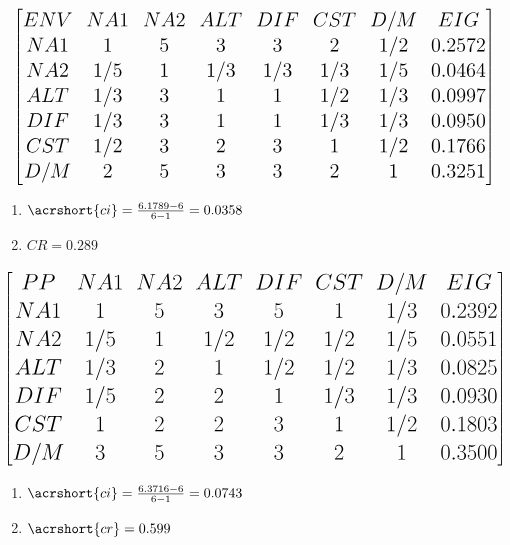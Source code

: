 \documentclass[aspectratio=1610,pdftex,dvipsnames,compress,xcolor={dvipsnames}]{beamer}
\newcommand{\acs}{\acrshort} %
\begin{document}
\begin{frame}{}
    \begin{equation}
        \Large
        \begin{bmatrix}
            ENV &NA1 &NA2 &ALT &DIF &CST &D/M &EIG \\
            NA1 &1 &5 &3 &3 &2 &1/2 &0.2572 \\
            NA2 &1/5 &1 &1/3 &1/3 &1/3 &1/5 &0.0464 \\
            ALT &1/3 &3 &1 &1 &1/2 &1/3 &0.0997 \\
            DIF &1/3 &3 &1 &1 &1/3 &1/3 &0.0950 \\ 
            CST &1/2 &3 &2 &3 &1 &1/2 &0.1766 \\ 
            D/M &2 &5 &3 &3 &2 &1 &0.3251 
        \end{bmatrix} 
    \end{equation}

    \begin{enumerate}[series=outerlist,topsep=0pt,itemsep=5pt,leftmargin=*,label=(\arabic*)]
        \item[]$\acs{ci} = \frac{6.1789-6}{6-1} = 0.0358$
        \item[]$CR = 0.289$
    \end{enumerate}
\end{frame}


\begin{frame}{}
    \begin{equation}
        \LARGE
        \begin{bmatrix}
            PP &NA1 &NA2 &ALT &DIF &CST &D/M &EIG \\ 
            NA1 &1 &5 &3 &5 &1 &1/3 &0.2392 \\ 
            NA2 &1/5 &1 &1/2 &1/2 &1/2 &1/5 &0.0551 \\ 
            ALT &1/3 &2 &1 &1/2 &1/2 &1/3 &0.0825 \\ 
            DIF &1/5 &2 &2 &1 &1/3 &1/3 &0.0930 \\ 
            CST &1 &2 &2 &3 &1 &1/2 &0.1803 \\ 
            D/M &3 &5 &3 &3 &2 &1 &0.3500 
        \end{bmatrix} 
    \end{equation}

    \begin{enumerate}[series=outerlist,topsep=0pt,itemsep=5pt,leftmargin=*,label=(\arabic*)]
        \item[]$\acs{ci} = \frac{6.3716-6}{6-1} = 0.0743$
        \item[]$\acs{cr} = 0.599$
    \end{enumerate}
\end{frame}
\end{document}
